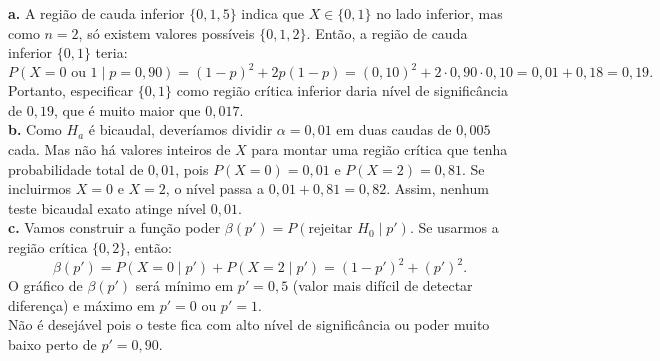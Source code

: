 \documentclass[12pt]{article}
\begin{document}
\textbf{a.} A região de cauda inferior $\{0,1,5\}$ indica que $X \in \{0,1\}$ no lado inferior, mas como $n=2$, só existem valores possíveis $\{0,1,2\}$. Então, a região de cauda inferior $\{0,1\}$ teria:
\[
P(X=0 \text{ ou } 1 \mid p=0,90) = (1-p)^2 + 2p(1-p) = (0,10)^2 + 2 \cdot 0,90 \cdot 0,10 = 0,01+0,18=0,19.
\]
Portanto, especificar $\{0,1\}$ como região crítica inferior daria nível de significância de $0,19$, que é muito maior que $0,017$.\\

\textbf{b.} Como $H_a$ é bicaudal, deveríamos dividir $\alpha=0,01$ em duas caudas de $0,005$ cada. Mas não há valores inteiros de $X$ para montar uma região crítica que tenha probabilidade total de $0,01$, pois $P(X=0)=0,01$ e $P(X=2)=0,81$. Se incluirmos $X=0$ e $X=2$, o nível passa a $0,01+0,81=0,82$. Assim, nenhum teste bicaudal exato atinge nível $0,01$.\\

\textbf{c.} Vamos construir a função poder $\beta(p')=P(\text{rejeitar }H_0 \mid p')$. Se usarmos a região crítica $\{0,2\}$, então:
\[
\beta(p')=P(X=0 \mid p')+P(X=2 \mid p') = (1-p')^2 + (p')^2.
\]
O gráfico de $\beta(p')$ será mínimo em $p'=0,5$ (valor mais difícil de detectar diferença) e máximo em $p'=0$ ou $p'=1$.\\
Não é desejável pois o teste fica com alto nível de significância ou poder muito baixo perto de $p'=0,90$.\\
\end{document}
